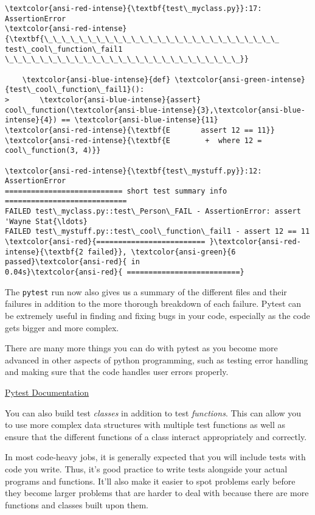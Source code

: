 \begin{Verbatim}[commandchars=\\\{\}]
\textcolor{ansi-red-intense}{\textbf{test\_myclass.py}}:17: AssertionError
\textcolor{ansi-red-intense}{\textbf{\_\_\_\_\_\_\_\_\_\_\_\_\_\_\_\_\_\_\_\_\_\_\_\_\_\_\_ test\_cool\_function\_fail1
\_\_\_\_\_\_\_\_\_\_\_\_\_\_\_\_\_\_\_\_\_\_\_\_\_\_\_}}

    \textcolor{ansi-blue-intense}{def} \textcolor{ansi-green-intense}{test\_cool\_function\_fail1}():
>       \textcolor{ansi-blue-intense}{assert}
cool\_function(\textcolor{ansi-blue-intense}{3},\textcolor{ansi-blue-intense}{4}) == \textcolor{ansi-blue-intense}{11}
\textcolor{ansi-red-intense}{\textbf{E       assert 12 == 11}}
\textcolor{ansi-red-intense}{\textbf{E        +  where 12 = cool\_function(3, 4)}}

\textcolor{ansi-red-intense}{\textbf{test\_mystuff.py}}:12: AssertionError
=========================== short test summary info ============================
FAILED test\_myclass.py::test\_Person\_FAIL - AssertionError: assert 'Wayne Stat{\ldots}
FAILED test\_mystuff.py::test\_cool\_function\_fail1 - assert 12 == 11
\textcolor{ansi-red}{========================= }\textcolor{ansi-red-intense}{\textbf{2 failed}}, \textcolor{ansi-green}{6 passed}\textcolor{ansi-red}{ in
0.04s}\textcolor{ansi-red}{ ==========================}
    \end{Verbatim}

    The \texttt{pytest} run now also gives us a summary of the different
files and their failures in addition to the more thorough breakdown of
each failure. Pytest can be extremely useful in finding and fixing bugs
in your code, especially as the code gets bigger and more complex.

There are many more things you can do with pytest as you become more
advanced in other aspects of python programming, such as testing error
handling and making sure that the code handles user errors properly.

\href{https://docs.pytest.org/_/downloads/en/latest/pdf/}{Pytest
Documentation}

You can also build test \emph{classes} in addition to test
\emph{functions}. This can allow you to use more complex data structures
with multiple test functions as well as ensure that the different
functions of a class interact appropriately and correctly.

In most code-heavy jobs, it is generally expected that you will include
tests with code you write. Thus, it's good practice to write tests
alongside your actual programs and functions. It'll also make it easier
to spot problems early before they become larger problems that are
harder to deal with because there are more functions and classes built
upon them.
